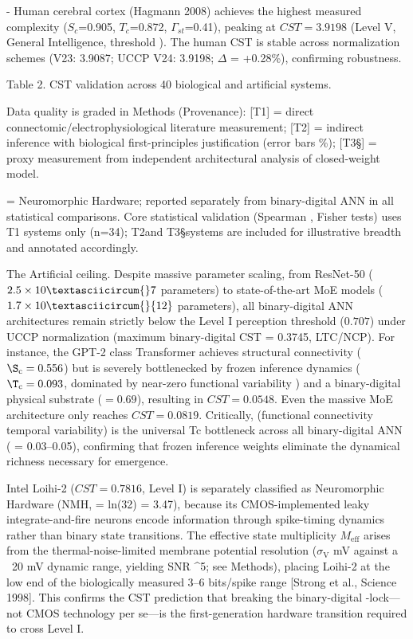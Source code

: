 \documentclass[a4paper,12pt]{article}
\begin{document}
- Human cerebral cortex (Hagmann 2008) achieves the highest measured complexity ($S_{c}$=0.905, $T_{c}$=0.872, $\Gamma_{st}$=0.41), peaking at $CST = 3.9198$ (Level V, General Intelligence, threshold  \pi   {}). The human CST is stable across normalization schemes (V23: 3.9087; UCCP V24: 3.9198; $\Delta$ = +0.28\%), confirming robustness.

Table 2. CST validation across 40 biological and artificial systems.

Data quality is graded in Methods (\SData Provenance): [T1] = direct connectomic/electrophysiological literature measurement; [T2\dag] = indirect inference with biological first-principles justification (error bars  \%); [T3\S] = proxy measurement from independent architectural analysis of closed-weight model.

\dagNMH = Neuromorphic Hardware; reported separately from binary-digital ANN in all statistical comparisons. Core statistical validation (Spearman  \rho , Fisher tests) uses T1 systems only (n=34); T2\dag and T3\S systems are included for illustrative breadth and annotated accordingly.

The Artificial ceiling.
Despite massive parameter scaling, from ResNet-50 ($2.5 \times 10\textasciicircum{}7$ parameters) to state-of-the-art MoE models ($1.7 \times 10\textasciicircum{}{12}$ parameters), all binary-digital ANN architectures remain strictly below the Level I perception threshold ($0.707$) under UCCP normalization (maximum binary-digital CST = 0.3745, LTC/NCP).
For instance, the GPT-2 class Transformer achieves structural connectivity ($\S_{\text{c}}=0.556$) but is severely bottlenecked by frozen inference dynamics ($\T_{\text{c}}=0.093$, dominated by near-zero functional variability  ) and a binary-digital physical substrate (\alpha$=0.69$), resulting in $CST = 0.0548$.
Even the massive MoE architecture only reaches $CST = 0.0819$.
Critically,  \Psi  (functional connectivity temporal variability) is the universal Tc bottleneck across all binary-digital ANN ( \Psi  = 0.03--0.05), confirming that frozen inference weights eliminate the dynamical richness necessary for emergence.

Intel Loihi-2 ($CST = 0.7816$, Level I) is separately classified as Neuromorphic Hardware (NMH,  \alpha  = ln(32) = 3.47), because its CMOS-implemented leaky integrate-and-fire neurons encode information through spike-timing dynamics rather than binary state transitions.
The effective state multiplicity $M_{\text{eff}}$   arises from the thermal-noise-limited membrane potential resolution ($\sigma_{\text{V}}$   mV against a ~20 mV dynamic range, yielding SNR    ^5; see Methods), placing Loihi-2 at the low end of the biologically measured 3--6 bits/spike range [Strong et al., Science 1998].
This confirms the CST prediction that breaking the binary-digital  \alpha -lock---not CMOS technology per se---is the first-generation hardware transition required to cross Level I.
\end{document}
